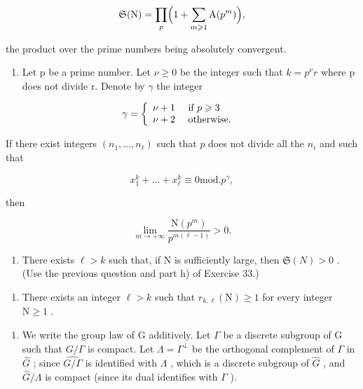 \[
\mathfrak {S} (\mathrm{N}) = \prod_ {p} \Bigl (1 + \sum_ {m \geqslant 1} \mathrm{A} (p ^ {m}) \Bigr),
\]

the product over the prime numbers being absolutely convergent.

\begin{enumerate}
\def\labelenumi{\alph{enumi})}
\setcounter{enumi}{7}
\tightlist
\item
  Let p be a prime number. Let \(\nu \geqslant 0\) be the integer such that \(k = p^{\nu}r\) where p does not divide r. Denote by \(\gamma\) the integer
\end{enumerate}

\[
\gamma = \left\{ \begin{array}{l l} \nu + 1 & \text { if } p \geqslant 3 \\ \nu + 2 & \text { otherwise. } \end{array} \right.
\]

If there exist integers \((n_1, \ldots, n_\ell)\) such that \(p\) does not divide all the \(n_i\) and such that

\[
x _ {1} ^ {k} + \dots + x _ {\ell} ^ {k} \equiv 0 \mathrm{mod.} p ^ {\gamma},
\]

then

\[
\lim _ {m \to + \infty} \frac {\mathrm{N} (p ^ {m})}{p ^ {m (\ell - 1)}} > 0.
\]

\begin{enumerate}
\def\labelenumi{\roman{enumi})}
\tightlist
\item
  There exists \(\ell > k\) such that, if N is sufficiently large, then \(\mathfrak{S}(N) > 0\) . (Use the previous question and part h) of Exercise 33.)
\end{enumerate}

\begin{enumerate}
\def\labelenumi{\alph{enumi})}
\setcounter{enumi}{9}
\tightlist
\item
  There exists an integer \(\ell > k\) such that \(r_{k,\ell}(\mathrm{N}) \geqslant 1\) for every integer \(\mathrm{N} \geqslant 1\) .
\end{enumerate}

\begin{enumerate}
\def\labelenumi{\arabic{enumi})}
\setcounter{enumi}{67}
\tightlist
\item
  We write the group law of G additively. Let \(\Gamma\) be a discrete subgroup of G such that \(G / \Gamma\) is compact. Let \(\Lambda = \Gamma^{\perp}\) be the orthogonal complement of \(\Gamma\) in \(\widehat{G}\) ; since \(\widehat{G / \Gamma}\) is identified with \(\Lambda\) , which is a discrete subgroup of \(\widehat{G}\) , and \(\widehat{G} / \Lambda\) is compact (since its dual identifies with \(\Gamma\) ).
\end{enumerate}

